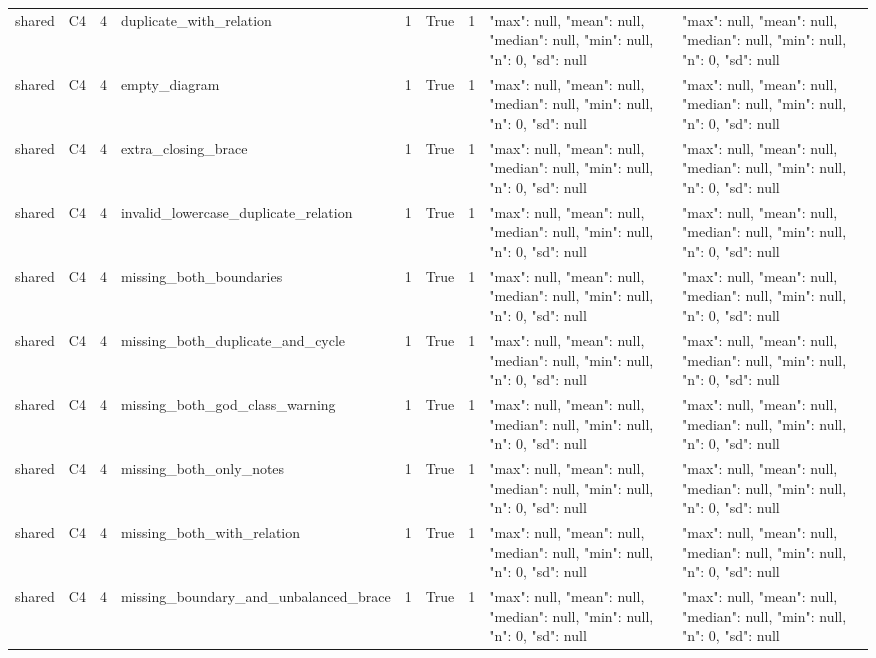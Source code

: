 \begin{tabular}{lllllllll}
shared & C4 & 4 & duplicate\_with\_relation & 1 & True & 1 & {"max": null, "mean": null, "median": null, "min": null, "n": 0, "sd": null} & {"max": null, "mean": null, "median": null, "min": null, "n": 0, "sd": null} \\
shared & C4 & 4 & empty\_diagram & 1 & True & 1 & {"max": null, "mean": null, "median": null, "min": null, "n": 0, "sd": null} & {"max": null, "mean": null, "median": null, "min": null, "n": 0, "sd": null} \\
shared & C4 & 4 & extra\_closing\_brace & 1 & True & 1 & {"max": null, "mean": null, "median": null, "min": null, "n": 0, "sd": null} & {"max": null, "mean": null, "median": null, "min": null, "n": 0, "sd": null} \\
shared & C4 & 4 & invalid\_lowercase\_duplicate\_relation & 1 & True & 1 & {"max": null, "mean": null, "median": null, "min": null, "n": 0, "sd": null} & {"max": null, "mean": null, "median": null, "min": null, "n": 0, "sd": null} \\
shared & C4 & 4 & missing\_both\_boundaries & 1 & True & 1 & {"max": null, "mean": null, "median": null, "min": null, "n": 0, "sd": null} & {"max": null, "mean": null, "median": null, "min": null, "n": 0, "sd": null} \\
shared & C4 & 4 & missing\_both\_duplicate\_and\_cycle & 1 & True & 1 & {"max": null, "mean": null, "median": null, "min": null, "n": 0, "sd": null} & {"max": null, "mean": null, "median": null, "min": null, "n": 0, "sd": null} \\
shared & C4 & 4 & missing\_both\_god\_class\_warning & 1 & True & 1 & {"max": null, "mean": null, "median": null, "min": null, "n": 0, "sd": null} & {"max": null, "mean": null, "median": null, "min": null, "n": 0, "sd": null} \\
shared & C4 & 4 & missing\_both\_only\_notes & 1 & True & 1 & {"max": null, "mean": null, "median": null, "min": null, "n": 0, "sd": null} & {"max": null, "mean": null, "median": null, "min": null, "n": 0, "sd": null} \\
shared & C4 & 4 & missing\_both\_with\_relation & 1 & True & 1 & {"max": null, "mean": null, "median": null, "min": null, "n": 0, "sd": null} & {"max": null, "mean": null, "median": null, "min": null, "n": 0, "sd": null} \\
shared & C4 & 4 & missing\_boundary\_and\_unbalanced\_brace & 1 & True & 1 & {"max": null, "mean": null, "median": null, "min": null, "n": 0, "sd": null} & {"max": null, "mean": null, "median": null, "min": null, "n": 0, "sd": null} \\

\end{tabular}
